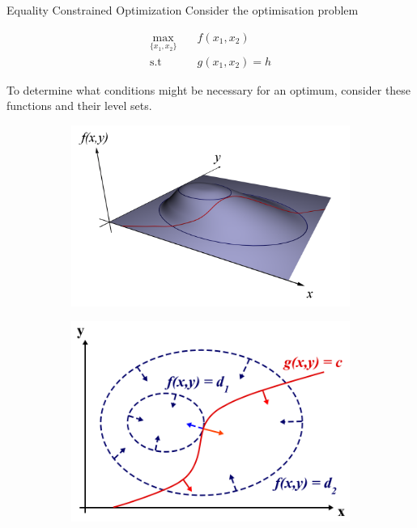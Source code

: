 \documentclass[11pt, xcolor={dvipsnames}, hyperref={colorlinks, allcolors=Blue}]{beamer}
\begin{document}
\begin{frame}{Equality Constrained Optimization}
Consider the optimisation problem

\begin{align*}
\underset{\{x_{1}, x_{2}\}}{\mathrm{max}}  \quad& f(x_{1}, x_{2})\\
\text{s.t}\quad \ \ & g(x_{1}, x_{2}) = h
\end{align*}

To determine what conditions might be necessary for an optimum, consider these functions and their level sets.

\begin{figure}
	\begin{subfigure}[b]{0.45\textwidth}
		\centering
		\includegraphics[width=\textwidth]{LagrangeMultipliers3D.png} 
	\end{subfigure}\hfill
	\begin{subfigure}[b]{0.45\textwidth}
		\centering
		\includegraphics[width=\textwidth]{LagrangeMultipliers2D.png} 
	\end{subfigure}\hfill
\end{figure}


\end{frame}
\end{document}
